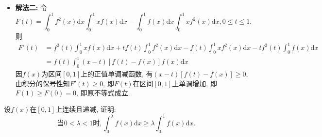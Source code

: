 \documentclass[12pt]{article}
\newenvironment{solution}[2][Solution]{\begin{trivlist}
\item[\hskip \labelsep {\bfseries #1}]}{\end{trivlist}}
\newenvironment{problem}[2][Problem]{\begin{trivlist}
\item[\hskip \labelsep {\bfseries #1}\hskip \labelsep {\bfseries #2.}]}{\end{trivlist}}
\begin{document}
\begin{solution}{3}
\begin{itemize}
        \item \textbf{解法二:} 令
            \[
                F(t) = \int_0^1 f^2(x)\mathrm{d}x \int_0^1 xf(x)\mathrm{d}x - \int_0^1 f(x)\mathrm{d}x \int_0^1 xf^2(x)\mathrm{d}x, 0\leq t\leq 1.
            \]
            则
            \[
                \begin{aligned}
                    F'(t) &= f^2(t)\int_0^1 xf(x)\mathrm{d}x + tf(t)\int_0^1 f^2(x)\mathrm{d}x - f(t)\int_0^1 xf^2(x)\mathrm{d}x - tf^2(t)\int_0^1 f(x)\mathrm{d}x \\
                    &= f(t)\int_0^1 (x - t)[f(t) - f(x)]f(x)\mathrm{d}x
                \end{aligned}
            \]
            因$f(x)$为区间$\left[0, 1\right]$上的正值单调减函数, 有$(x-t)[f(t)-f(x)] \geq 0$, 由积分的保号性知$F'(t)\geq 0$, 即$F(t)$在区间$\left[0, 1\right]$上单调增加,
            即$F(1) \geq F(0) = 0$, 即原不等式成立. 
    \end{itemize}
\end{solution}


\vspace{3cm}


\begin{problem}{4}
    
    设$f(x)$在$\left[0, 1\right]$上连续且递减, 证明:
    \[
        \text{当}0<\lambda <1\text{时}, \int_0^{\lambda} f(x)\mathrm{d}x \geq \lambda \int_0^1 f(x)\mathrm{d}x.    
    \]
\end{problem}
\end{document}
